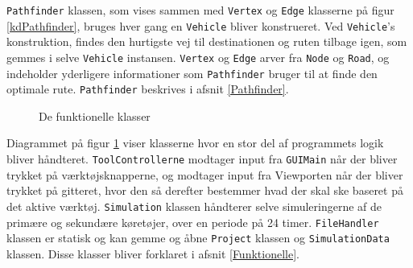 \texttt{Pathfinder} klassen, som vises sammen med \texttt{Vertex} og \texttt{Edge} klasserne på figur \ref{kdPathfinder}, bruges hver gang en \texttt{Vehicle} bliver konstrueret. Ved \texttt{Vehicle}'s konstruktion, findes den hurtigste vej til destinationen og ruten tilbage igen, som gemmes i selve \texttt{Vehicle} instansen. \texttt{Vertex} og \texttt{Edge} arver fra \texttt{Node} og \texttt{Road}, og indeholder yderligere informationer som \texttt{Pathfinder} bruger til at finde den optimale rute. \texttt{Pathfinder} beskrives i afsnit \ref{Pathfinder}.

\begin{figure}[H]
    \centering
    \caption{De funktionelle klasser}
    \label{kdFunktionelle}
\end{figure}

Diagrammet på figur \ref{kdFunktionelle} viser klasserne hvor en stor del af programmets logik bliver håndteret. \texttt{ToolControllerne} modtager input fra \texttt{GUIMain} når der bliver trykket på værktøjsknapperne, og modtager input fra Viewporten når der bliver trykket på gitteret, hvor den så derefter bestemmer hvad der skal ske baseret på det aktive værktøj. \texttt{Simulation} klassen håndterer selve simuleringerne af de primære og sekundære køretøjer, over en periode på 24 timer. \texttt{FileHandler} klassen er statisk og kan gemme og åbne \texttt{Project} klassen og \texttt{SimulationData} klassen. Disse klasser bliver forklaret i afsnit \ref{Funktionelle}.